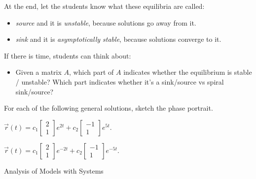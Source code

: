 \begin{annotation}
	\begin{goals}
	At the end, let the students know what these equilibria are called:
	\begin{itemize}
		\item \emph{source} and it is \emph{unstable}, because solutions go away from it.
		\item \emph{sink} and it is \emph{asymptotically stable}, because solutions converge to it.
	\end{itemize}
	
	If there is time, students can think about:
	\begin{itemize}
		\item Given a matrix $A$, which part of $A$ indicates whether the equilibrium is stable / unstable? Which part indicates whether it's a sink/source vs spiral sink/source?
	\end{itemize}
	\end{goals}
\end{annotation}
\question
	For each of the following general solutions, sketch the phase portrait.
\begin{parts}
	\item $	\vec{r}(t) = c_1 \begin{bmatrix} 2 \\ 1 \end{bmatrix} e^{2t} + c_2 \begin{bmatrix} -1 \\ 1 \end{bmatrix} e^{5t}.$
	\item $	\vec{r}(t) = c_1 \begin{bmatrix} 2 \\ 1 \end{bmatrix} e^{-2t} + c_2 \begin{bmatrix} -1 \\ 1 \end{bmatrix} e^{-5t}.$	
\end{parts}





\standardonlynewpage

%
%



\begin{module}{Analysis of Models with Systems}
	\label{sys:analysis}

	
	
\end{module}



